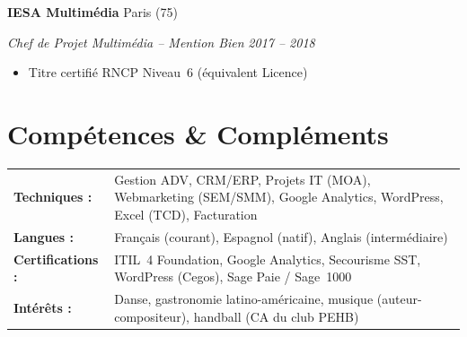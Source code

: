 \documentclass[10pt,letterpaper]{article}
\newcommand{\entry}[4]{%
  \noindent\textbf{#1} \hfill #2 \par\nopagebreak
  \textit{#3} \hfill \textit{#4} \par\nopagebreak
}
\begin{document}
\entry{IESA Multim\'edia}{Paris (75)}{Chef de Projet Multim\'edia -- Mention Bien}{2017 -- 2018}
\begin{itemize}
  \item Titre certifi\'e RNCP Niveau~6 (\'equivalent Licence)
\end{itemize}
\vspace{0.2em}

\section{Comp\'etences \& Compl\'ements}

\begin{tabularx}{\textwidth}{@{} p{2.2cm} X @{}}
\textbf{Techniques :} & Gestion ADV, CRM/ERP, Projets IT (MOA), Webmarketing (SEM/SMM), Google Analytics, WordPress, Excel (TCD), Facturation \\
\textbf{Langues :} & Fran\c{c}ais (courant), Espagnol (natif), Anglais (interm\'ediaire) \\
\textbf{Certifications :} & ITIL~4 Foundation, Google Analytics, Secourisme SST, WordPress (Cegos), Sage Paie / Sage~1000 \\
\textbf{Int\'er\^ets :} & Danse, gastronomie latino-am\'ericaine, musique (auteur-compositeur), handball (CA du club PEHB) \\
\end{tabularx}
\end{document}

